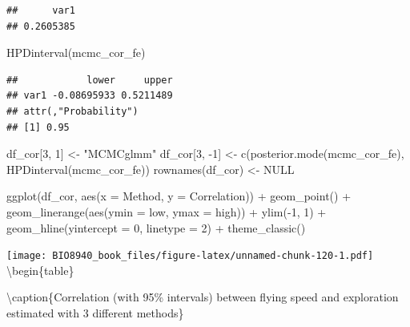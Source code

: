 \documentclass[
  12pt,
]{book}
\newenvironment{Shaded}{\begin{snugshade}}{\end{snugshade}}
\newcommand{\AttributeTok}[1]{\textcolor[rgb]{0.77,0.63,0.00}{#1}}
\newcommand{\ConstantTok}[1]{\textcolor[rgb]{0.00,0.00,0.00}{#1}}
\newcommand{\DecValTok}[1]{\textcolor[rgb]{0.00,0.00,0.81}{#1}}
\newcommand{\FunctionTok}[1]{\textcolor[rgb]{0.00,0.00,0.00}{#1}}
\newcommand{\NormalTok}[1]{#1}
\newcommand{\OtherTok}[1]{\textcolor[rgb]{0.56,0.35,0.01}{#1}}
\newcommand{\SpecialCharTok}[1]{\textcolor[rgb]{0.00,0.00,0.00}{#1}}
\newcommand{\StringTok}[1]{\textcolor[rgb]{0.31,0.60,0.02}{#1}}
\begin{document}
\begin{verbatim}
##      var1 
## 0.2605385
\end{verbatim}

\begin{Shaded}
\begin{Highlighting}[]
\FunctionTok{HPDinterval}\NormalTok{(mcmc\_cor\_fe)}
\end{Highlighting}
\end{Shaded}

\begin{verbatim}
##            lower     upper
## var1 -0.08695933 0.5211489
## attr(,"Probability")
## [1] 0.95
\end{verbatim}

\begin{Shaded}
\begin{Highlighting}[]
\NormalTok{df\_cor[}\DecValTok{3}\NormalTok{, }\DecValTok{1}\NormalTok{] }\OtherTok{\textless{}{-}} \StringTok{"MCMCglmm"}
\NormalTok{df\_cor[}\DecValTok{3}\NormalTok{, }\SpecialCharTok{{-}}\DecValTok{1}\NormalTok{] }\OtherTok{\textless{}{-}} \FunctionTok{c}\NormalTok{(}\FunctionTok{posterior.mode}\NormalTok{(mcmc\_cor\_fe), }\FunctionTok{HPDinterval}\NormalTok{(mcmc\_cor\_fe))}
\FunctionTok{rownames}\NormalTok{(df\_cor) }\OtherTok{\textless{}{-}} \ConstantTok{NULL}

\FunctionTok{ggplot}\NormalTok{(df\_cor, }\FunctionTok{aes}\NormalTok{(}\AttributeTok{x =}\NormalTok{ Method, }\AttributeTok{y =}\NormalTok{ Correlation)) }\SpecialCharTok{+}
  \FunctionTok{geom\_point}\NormalTok{() }\SpecialCharTok{+}
  \FunctionTok{geom\_linerange}\NormalTok{(}\FunctionTok{aes}\NormalTok{(}\AttributeTok{ymin =}\NormalTok{ low, }\AttributeTok{ymax =}\NormalTok{ high)) }\SpecialCharTok{+}
  \FunctionTok{ylim}\NormalTok{(}\SpecialCharTok{{-}}\DecValTok{1}\NormalTok{, }\DecValTok{1}\NormalTok{) }\SpecialCharTok{+}
  \FunctionTok{geom\_hline}\NormalTok{(}\AttributeTok{yintercept =} \DecValTok{0}\NormalTok{, }\AttributeTok{linetype =} \DecValTok{2}\NormalTok{) }\SpecialCharTok{+}
  \FunctionTok{theme\_classic}\NormalTok{()}
\end{Highlighting}
\end{Shaded}

\texttt{[image: BIO8940\_book\_files/figure-latex/unnamed-chunk-120-1.pdf]}
\textbackslash begin\{table\}

\textbackslash caption\{\label{tab:unnamed-chunk-121}Correlation (with 95\% intervals) between flying speed and exploration estimated with 3 different methods\}
\centering
\end{document}
